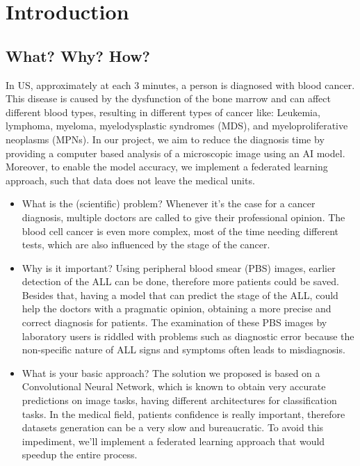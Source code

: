 \documentclass[runningheads,a4paper,11pt]{report}
\begin{document}
\tableofcontents

\newpage

\listoftables
\listoffigures
\listofalgorithms

\newpage




\newpage



 


\chapter{Introduction}
\label{chapter:introduction}

\section{What? Why? How?}
\label{section:what}

In US, approximately at each 3 minutes, a person is diagnosed with blood cancer. This disease is caused by the dysfunction of the bone marrow and can affect different blood types, resulting in different types of cancer like: Leukemia, lymphoma, myeloma, myelodysplastic syndromes (MDS), and myeloproliferative neoplasms (MPNs). In our project, we aim to reduce the diagnosis time by providing a computer based analysis of a microscopic image using an AI model. Moreover, to enable the model accuracy, we implement a federated learning approach, such that data does not leave the medical units.
\begin{itemize}
	\item What is the (scientific) problem? 
 Whenever it's the case for a cancer diagnosis, multiple doctors are called to give their professional opinion. The blood cell cancer is even more complex, most of the time needing different tests, which are also influenced by the stage of the cancer.  
	\item Why is it important? 
 Using peripheral blood smear (PBS) images, earlier detection of the ALL can be done, therefore more patients could be saved. Besides that, having a model that can predict the stage of the ALL, could help the doctors with a pragmatic opinion, obtaining a more precise and correct diagnosis for patients. The examination of these PBS images by laboratory users is riddled with problems such as diagnostic error because the non-specific nature of ALL signs and symptoms often leads to misdiagnosis.
	\item What is your basic approach? 
 The solution we proposed is based on a Convolutional Neural Network, which is known to obtain very accurate predictions on image tasks, having different architectures for classification tasks. In the medical field, patients confidence is really important, therefore datasets generation can be a very slow and bureaucratic. To avoid this impediment, we'll implement a federated learning approach that would speedup the entire process.
\end{itemize}
\end{document}
